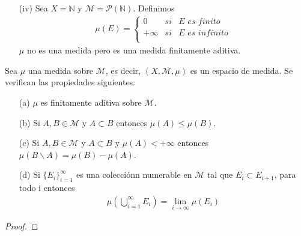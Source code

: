 \begin{ejemplo}
\begin{enumerate}
        \item[(iv)] Sea $X = \mathbb{N}$ y $\mathcal{M} = \mathcal{P}(\mathbb{N})$. Definimos
              \begin{align*}
                  \mu(E) =  \left\{ \begin{array}{lcc}
                                        0       & si & \textit{E es finito}   \\
                                        +\infty & si & \textit{E es infinito} \\
                                    \end{array}
                  \right.
              \end{align*}
              $\mu$ no es una medida pero es una medida finitamente aditiva.
    \end{enumerate}
\end{ejemplo}
\begin{prop}
    Sea $\mu$ una medida sobre $\mathcal{M}$, es decir, $(X, \mathcal{M}, \mu)$ es un espacio de medida. Se verifican las propiedades siguientes:
    \begin{enumerate}
        \item[(a)] $\mu$ es finitamente aditiva sobre $\mathcal{M}$.
        \item[(b)] Si $A, B \in \mathcal{M}$ y $A \subset B$ entonces $\mu(A) \leq \mu(B)$.
        \item[(c)] Si $A, B \in \mathcal{M}$ y $A \subset B$ y $\mu(A) < +\infty$ entonces $\mu(B \backslash A) = \mu(B) - \mu(A)$.
        \item[(d)] Si  $\{ E_i \}_{i=1}^{\infty}$ es una colecciónn numerable en $\mathcal{M}$ tal que $E_i \subset E_{i+1}$, para todo i entonces
              \begin{align*}
                  \mu \left( \bigcup_{i=1}^{\infty}{E_i} \right) = \lim_{i \to \infty}{\mu(E_i)}
              \end{align*}
    \end{enumerate}
\end{prop}
\begin{proof}

\end{proof}

